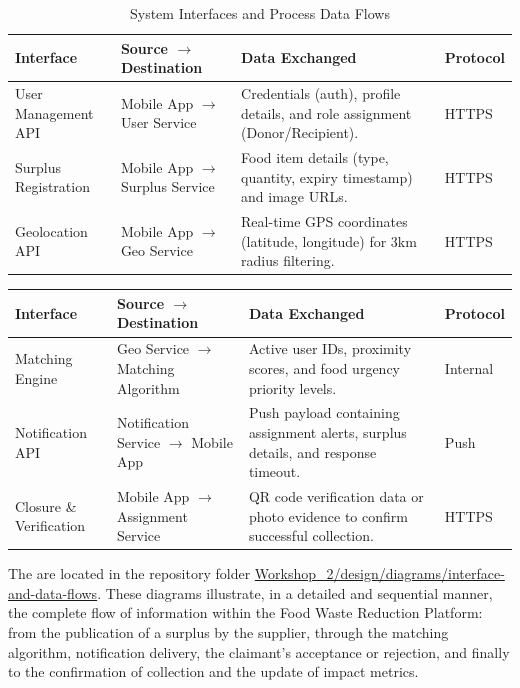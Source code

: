 \documentclass[conference]{IEEEtran}
\begin{document}
\begin{table}[h]
\centering
\caption{System Interfaces and Process Data Flows}
\label{tab:system_interfaces}

\begin{tabular}{@{}p{1.8cm}p{2.0cm}p{2.5cm}p{1.2cm}@{}}
\toprule
\textbf{Interface} & \textbf{Source $\rightarrow$ Destination} & \textbf{Data Exchanged} & \textbf{Protocol} \\
\midrule
User Management API & Mobile App $\rightarrow$ User Service & Credentials (auth), profile details, and role assignment (Donor/Recipient). & HTTPS \\
\midrule
Surplus Registration & Mobile App $\rightarrow$ Surplus Service & Food item details (type, quantity, expiry timestamp) and image URLs. & HTTPS \\
\midrule
Geolocation API & Mobile App $\rightarrow$ Geo Service & Real-time GPS coordinates (latitude, longitude) for 3km radius filtering. & HTTPS \\
\bottomrule
\end{tabular}

\end{table}

\begin{table}[h]
\centering
\label{tab:system_interfaces}
\begin{tabular}{@{}p{1.8cm}p{2.0cm}p{2.5cm}p{1.2cm}@{}}
\toprule
\textbf{Interface} & \textbf{Source $\rightarrow$ Destination} & \textbf{Data Exchanged} & \textbf{Protocol} \\
\midrule
Matching Engine & Geo Service $\rightarrow$ Matching Algorithm & Active user IDs, proximity scores, and food urgency priority levels. & Internal \\
\midrule
Notification API & Notification Service $\rightarrow$ Mobile App & Push payload containing assignment alerts, surplus details, and response timeout. & Push \\
\midrule
Closure \& Verification & Mobile App $\rightarrow$ Assignment Service & QR code verification data or photo evidence to confirm successful collection. & HTTPS \\
\end{tabular}
\end{table}

The  are located in the repository folder \href{https://github.com/Cristian7B/SystemAnalysisCourse/tree/main/Workshop_2/design/diagrams/interface-and-data-flows}{Workshop_2/design/diagrams/interface-and-data-flows}. These diagrams illustrate, in a detailed and sequential manner, the complete flow of information within the Food Waste Reduction Platform: from the publication of a surplus by the supplier, through the matching algorithm, notification delivery, the claimant’s acceptance or rejection, and finally to the confirmation of collection and the update of impact metrics.
\end{document}
